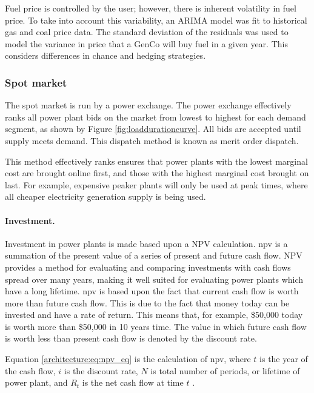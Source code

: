 Fuel price is controlled by the user; however, there is inherent volatility in fuel price. To take into account this variability, an ARIMA \cite{ARIMA} model was fit to historical gas and coal price data. The standard deviation of the residuals was used to model the variance in price that a GenCo will buy fuel in a given year. This considers differences in chance and hedging strategies.



\subsubsection{Spot market} The spot market is run by a power exchange. The power exchange effectively ranks all power plant bids on the market from lowest to highest for each demand segment, as shown by Figure \ref{fig:loaddurationcurve}. All bids are accepted until supply meets demand. This dispatch method is known as merit order dispatch. 

This method effectively ranks ensures that power plants with the lowest marginal cost are brought online first, and those with the highest marginal cost brought on last. For example, expensive peaker plants will only be used at peak times, where all cheaper electricity generation supply is being used. 

\paragraph{Investment.} Investment in power plants is made based upon a \Gls{NPV} calculation. \acrshort{npv} is a summation of the present value of a series of present and future cash flow. NPV provides a method for evaluating and comparing investments with cash flows spread over many years, making it well suited for evaluating power plants which have a long lifetime.  \acrshort{npv} is based upon the fact that current cash flow is worth more than future cash flow. This is due to the fact that money today can be invested and have a rate of return. This means that, for example, \$50,000 today is worth more than \$50,000 in 10 years time. The value in which future cash flow is worth less than present cash flow is denoted by the discount rate.

Equation \ref{architecture:eq:npv_eq} is the calculation of \acrshort{npv}, where $t$ is the year of the cash flow, $i$ is the discount rate, $N$ is total number of periods, or lifetime of power plant, and $R_t$ is the net cash flow at time $t$ \cite{nagalingam2020cim}.

